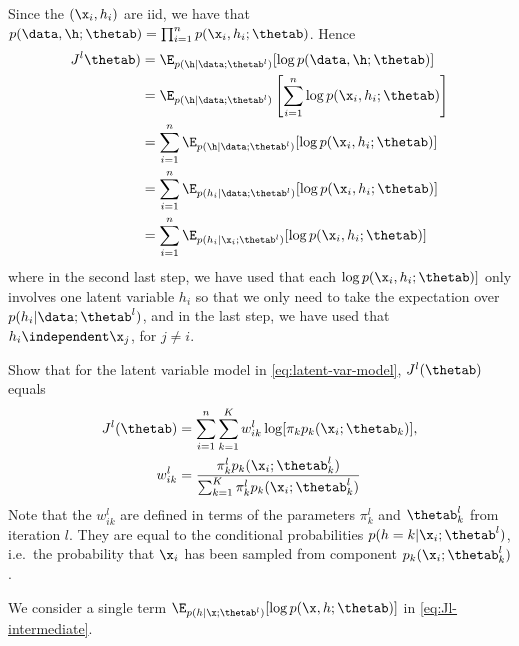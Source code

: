 \begin{exenumerate}
  \begin{solution}
    Since the $(\x_i, h_i)$ are iid, we have that $p(\data,\h; \thetab) =
    \prod_{i=1}^n p(\x_i, h_i; \thetab)$. Hence
    \begin{align}
      J^l\thetab) &= \E_{p(\h | \data; \thetab^l)} [ \log p(\data,\h; \thetab)]\\
                  & = \E_{p(\h | \data; \thetab^l)}\left[ \sum_{i=1}^n \log  p(\x_i, h_i; \thetab)\right]\\
                  & = \sum_{i=1}^n \E_{p(\h | \data; \thetab^l)}[ \log  p(\x_i, h_i; \thetab)]\\
                  & =  \sum_{i=1}^n \E_{p(h_i | \data; \thetab^l)}[ \log  p(\x_i, h_i; \thetab)]\\
                  & =  \sum_{i=1}^n \E_{p(h_i | \x_i; \thetab^l)}[ \log  p(\x_i, h_i; \thetab)] \label{eq:Jl-intermediate}
    \end{align}
    where in the second last step, we have used that each $\log p(\x_i, h_i;
    \thetab)]$ only involves one latent variable $h_i$ so that we only need to
    take the expectation over $p(h_i | \data; \thetab^l)$, and in the last step,
    we have used that $h_i \independent \x_j$, for $j\neq i$.
   
  \end{solution}

\item Show that for the latent variable model in \eqref{eq:latent-var-model},
  $J^l(\thetab)$ equals
  \begin{align}
    J^l(\thetab) & = \sum_{i=1}^n  \sum_{k=1}^K w_{ik}^l  \log[  \pi_k  p_k(\x_i; \thetab_k) ],\label{eq:Jl-expression}\\
     w_{ik}^l & =  \frac{ \pi^l_k p_k(\x_i; \thetab^l_k)}{ \sum_{k=1}^K \pi^l_k p_k(\x_i; \thetab^l_k)}\label{eq:w-def}
  \end{align}
  Note that the $w_{ik}^l$ are defined in terms of the parameters $\pi_k^l$ and
  $\thetab_k^l$ from iteration $l$. They are equal to the conditional
  probabilities $p(h=k|\x_i; \thetab^l)$, i.e.\ the probability that $\x_i$
  has been sampled from component $p_k(\x_i; \thetab^l_k)$. 
  
  \begin{solution}
    We consider a single term $ \E_{p(h| \x; \thetab^l)}[ \log p(\x, h;
    \thetab)]$ in \eqref{eq:Jl-intermediate}.


\end{solution}
\end{exenumerate}
